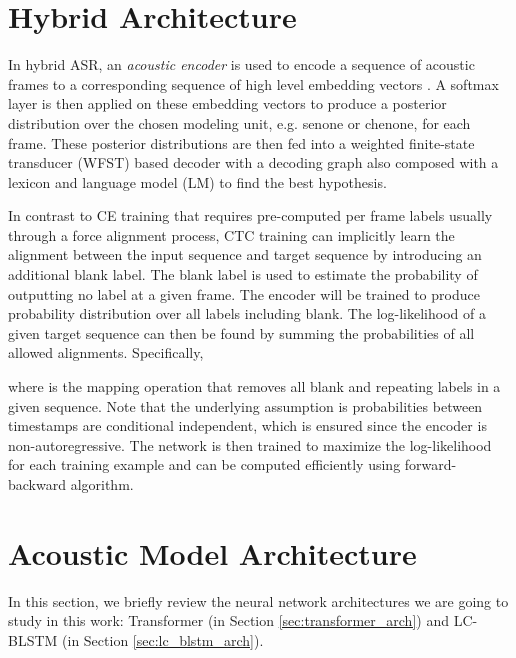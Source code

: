 \documentclass[a4paper]{article}
\begin{document}
\section{Hybrid Architecture}
\label{sec:hybrid}
In hybrid ASR, an \emph{acoustic encoder} is used to encode a sequence of acoustic frames  to a corresponding sequence of high level embedding vectors . A softmax layer is then applied on these embedding vectors to produce a posterior distribution over the chosen modeling unit, e.g. senone or chenone, for each frame. These posterior distributions are then fed into a weighted finite-state transducer (WFST)\cite{mohri2002weighted} based decoder with a decoding graph also composed with a lexicon and language model (LM) to find the best hypothesis. 

In contrast to CE training that requires pre-computed per frame labels usually through a force alignment process, CTC training can implicitly learn the alignment between the input sequence and target sequence by introducing an additional blank label. The blank label is used to estimate the probability of outputting no label at a given frame. The encoder will be trained to produce probability distribution over all labels including blank. The log-likelihood of a given target sequence  can then be found by summing the probabilities of all allowed alignments. Specifically, 

where  is the mapping operation that removes all blank and repeating labels in a given sequence. Note that the underlying assumption is probabilities between timestamps are conditional independent, which is ensured since the encoder is non-autoregressive. The network is then trained to maximize the log-likelihood for each training example and  can be computed efficiently using forward-backward algorithm.

\section{Acoustic Model Architecture}
\label{sec:am}
In this section, we briefly review the neural network architectures we are going to study in this work: Transformer (in Section \ref{sec:transformer_arch}) and LC-BLSTM (in Section \ref{sec:lc_blstm_arch}).
\end{document}
